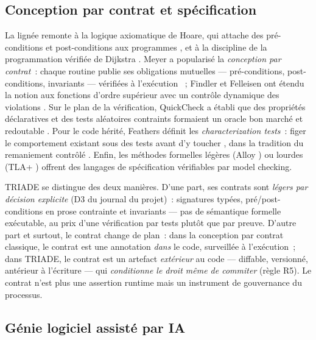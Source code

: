 \subsection{Conception par contrat et spécification}\label{sec:connexes-dbc}

La lignée remonte à la logique axiomatique de Hoare, qui attache des
pré-conditions et post-conditions aux programmes \cite{hoare1969}, et à la
discipline de la programmation vérifiée de Dijkstra \cite{dijkstra1976}.
Meyer a popularisé la \emph{conception par contrat}~: chaque routine publie
ses obligations mutuelles — pré-conditions, post-conditions, invariants —
vérifiées à l’exécution \cite{meyer1992}~; Findler et Felleisen ont étendu la
notion aux fonctions d’ordre supérieur avec un contrôle dynamique des
violations \cite{findler2002}. Sur le plan de la vérification, QuickCheck a
établi que des propriétés déclaratives et des tests aléatoires contraints
formaient un oracle bon marché et redoutable \cite{claessen2000}. Pour le
code hérité, Feathers définit les \emph{characterization tests}~: figer le
comportement existant sous des tests avant d’y toucher \cite{feathers2004},
dans la tradition du remaniement contrôlé \cite{fowler1999}. Enfin, les
méthodes formelles légères (Alloy \cite{jackson2006}) ou lourdes (TLA+
\cite{lamport2002}) offrent des langages de spécification vérifiables par
model checking.

TRIADE se distingue des deux manières. D’une part, ses contrats sont
\emph{légers par décision explicite} (D3 du journal du projet)~: signatures
typées, pré/post-conditions en prose contrainte et invariants — pas de
sémantique formelle exécutable, au prix d’une vérification par tests plutôt
que par preuve. D’autre part et surtout, le contrat change de plan~: dans la
conception par contrat classique, le contrat est une annotation \emph{dans} le
code, surveillée à l’exécution~; dans TRIADE, le contrat est un artefact
\emph{extérieur} au code — diffable, versionné, antérieur à l’écriture — qui
\emph{conditionne le droit même de commiter} (règle R5). Le contrat n’est
plus une assertion runtime mais un instrument de gouvernance du processus.

\subsection{Génie logiciel assisté par IA}\label{sec:connexes-aise}


